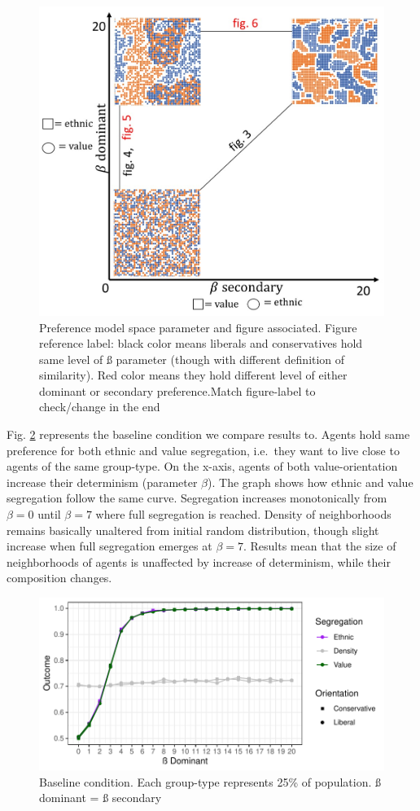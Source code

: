 \documentclass[
]{article}
\begin{document}
\begin{figure}[h]

{\centering \includegraphics[width=0.7\linewidth]{model_space} 

}

\caption{Preference model space parameter and figure associated. Figure reference label: black color means liberals and conservatives hold same level of ß parameter (though with different definition of similarity). Red color means they hold different level of either dominant or secondary preference.Match figure-label to check/change in the end}\label{fig:model_space}
\end{figure}

Fig. \ref{fig:bsl} represents the baseline condition we compare results
to. Agents hold same preference for both ethnic and value segregation,
i.e.~they want to live close to agents of the same group-type. On the
x-axis, agents of both value-orientation increase their determinism
(parameter \(\beta\)). The graph shows how ethnic and value segregation
follow the same curve. Segregation increases monotonically from
\(\beta = 0\) until \(\beta = 7\) where full segregation is reached.
Density of neighborhoods remains basically unaltered from initial random
distribution, though slight increase when full segregation emerges at
\(\beta = 7\). Results mean that the size of neighborhoods of agents is
unaffected by increase of determinism, while their composition changes.

\begin{figure}[H]

{\centering \includegraphics[width=0.8\linewidth]{ev_rum_files/figure-latex/bsl-1} 

}

\caption{Baseline condition. Each group-type represents 25\% of population. ß dominant = ß secondary}\label{fig:bsl}
\end{figure}
\end{document}
